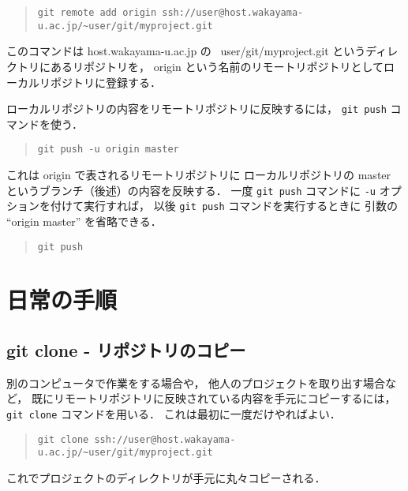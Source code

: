 \documentclass[a4j,10pt]{jarticle}
\begin{document}
\begin{quote}
\begin{verbatim}
git remote add origin ssh://user@host.wakayama-u.ac.jp/~user/git/myproject.git
\end{verbatim}
\end{quote}

このコマンドは host.wakayama-u.ac.jp の
~user/git/myproject.git というディレクトリにあるリポジトリを，
origin という名前のリモートリポジトリとしてローカルリポジトリに登録する．

ローカルリポジトリの内容をリモートリポジトリに反映するには，
\verb|git push| コマンドを使う．

\begin{quote}
\begin{verbatim}
git push -u origin master
\end{verbatim}
\end{quote}

これは origin で表されるリモートリポジトリに
ローカルリポジトリの master というブランチ（後述）の内容を反映する．
一度 \verb|git push| コマンドに \verb|-u| オプションを付けて実行すれば，
以後 \verb|git push| コマンドを実行するときに
引数の ``origin master'' を省略できる．

\begin{quote}
\begin{verbatim}
git push
\end{verbatim}
\end{quote}

\section{日常の手順}

\subsection{git clone - リポジトリのコピー}
別のコンピュータで作業をする場合や，
他人のプロジェクトを取り出す場合など，
既にリモートリポジトリに反映されている内容を手元にコピーするには，
\verb|git clone| コマンドを用いる．
これは最初に一度だけやればよい．

\begin{quote}
\begin{verbatim}
git clone ssh://user@host.wakayama-u.ac.jp/~user/git/myproject.git
\end{verbatim}
\end{quote}

これでプロジェクトのディレクトリが手元に丸々コピーされる．
\end{document}
